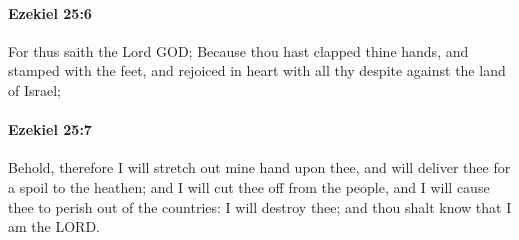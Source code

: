 		\paragraph{Ezekiel 25:6} %
			\label{EZEKIEL-25-6}

			For thus saith the Lord GOD; Because thou hast clapped thine hands, and stamped with the feet, and rejoiced in heart with all thy despite against the land of Israel;


		\paragraph{Ezekiel 25:7} %
			\label{EZEKIEL-25-7}

			Behold, therefore I will stretch out mine hand upon thee, and will deliver thee for a spoil to the heathen; and I will cut thee off from the people, and I will cause thee to perish out of the countries: I will destroy thee; and thou shalt know that I am the LORD.

